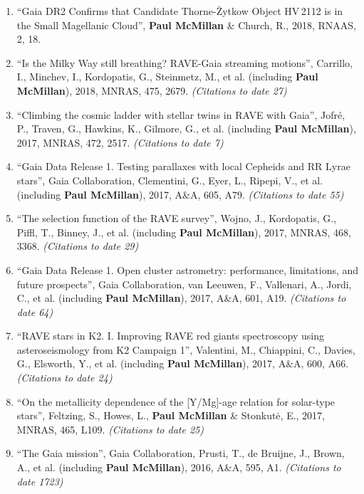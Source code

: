 \documentclass{resume}
\begin{document}
\begin{enumerate}
\item ``Gaia DR2 Confirms that Candidate Thorne-\.Zytkow Object HV\,2112 is in the Small Magellanic Cloud'', \textbf{Paul McMillan} \& Church, R., 2018, RNAAS, 2, 18.

\item ``Is the Milky Way still breathing? RAVE-Gaia streaming motions'', Carrillo, I., Minchev, I., Kordopatis, G., Steinmetz, M., et al. (including \textbf{Paul McMillan}), 2018, MNRAS, 475, 2679. \textit{(Citations to date 27)}

\item ``Climbing the cosmic ladder with stellar twins in RAVE with Gaia'', Jofr\'e, P., Traven, G., Hawkins, K., Gilmore, G., et al. (including \textbf{Paul McMillan}), 2017, MNRAS, 472, 2517. \textit{(Citations to date 7)}

\item ``Gaia Data Release 1. Testing parallaxes with local Cepheids and RR Lyrae stars'', Gaia Collaboration, Clementini, G., Eyer, L., Ripepi, V., et al. (including \textbf{Paul McMillan}), 2017, A\&A, 605, A79. \textit{(Citations to date 55)}

\item ``The selection function of the RAVE survey'', Wojno, J., Kordopatis, G., Piffl, T., Binney, J., et al. (including \textbf{Paul McMillan}), 2017, MNRAS, 468, 3368. \textit{(Citations to date 29)}

\item ``Gaia Data Release 1. Open cluster astrometry: performance, limitations, and future prospects'', Gaia Collaboration, van Leeuwen, F., Vallenari, A., Jordi, C., et al. (including \textbf{Paul McMillan}), 2017, A\&A, 601, A19. \textit{(Citations to date 64)}

\item ``RAVE stars in K2. I. Improving RAVE red giants spectroscopy using asteroseismology from K2 Campaign 1'', Valentini, M., Chiappini, C., Davies, G., Elsworth, Y., et al. (including \textbf{Paul McMillan}), 2017, A\&A, 600, A66. \textit{(Citations to date 24)}

\item ``On the metallicity dependence of the [Y/Mg]-age relation for solar-type stars'', Feltzing, S., Howes, L., \textbf{Paul McMillan} \& Stonkut\.{e}, E., 2017, MNRAS, 465, L109. \textit{(Citations to date 25)}

\item ``The Gaia mission'', Gaia Collaboration, Prusti, T., de Bruijne, J., Brown, A., et al. (including \textbf{Paul McMillan}), 2016, A\&A, 595, A1. \textit{(Citations to date 1723)}


\end{enumerate}
\end{document}
